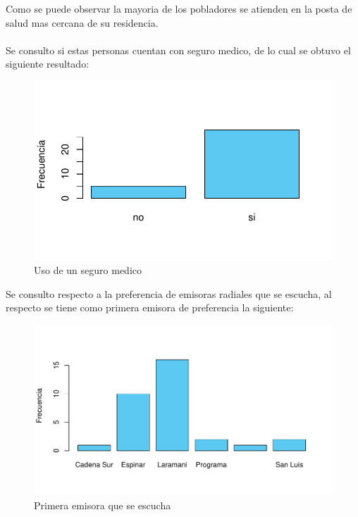 \documentclass[12pt]{article}\usepackage[]{graphicx}\usepackage[]{xcolor}
\makeatletter
\def\maxwidth{ %
  \ifdim\Gin@nat@width>\linewidth
    \linewidth
  \else
    \Gin@nat@width
  \fi
}
\newenvironment{knitrout}{}{} %
\makeatother
\begin{document}
  Como se puede observar la mayoria de los pobladores se atienden en la posta de salud mas cercana de su residencia.\\
  \\
	Se consulto si estas personas cuentan con seguro medico, de lo cual se obtuvo el siguiente resultado:
	\begin{figure}[H]
	\centering
\begin{knitrout}
\color{fgcolor}
\includegraphics[width=\maxwidth]{figure/doce-1} 
\end{knitrout}
	\caption{Uso de un seguro medico}
	\end{figure}
	Se consulto respecto a la preferencia de emisoras radiales que se escucha, al respecto se tiene como primera emisora de preferencia la siguiente:
	\begin{figure}[H]
	\centering
\begin{knitrout}
\color{fgcolor}
\includegraphics[width=\maxwidth]{figure/one-1} 
\end{knitrout}
	\caption{Primera emisora que se escucha}
	\end{figure}
\end{document}

